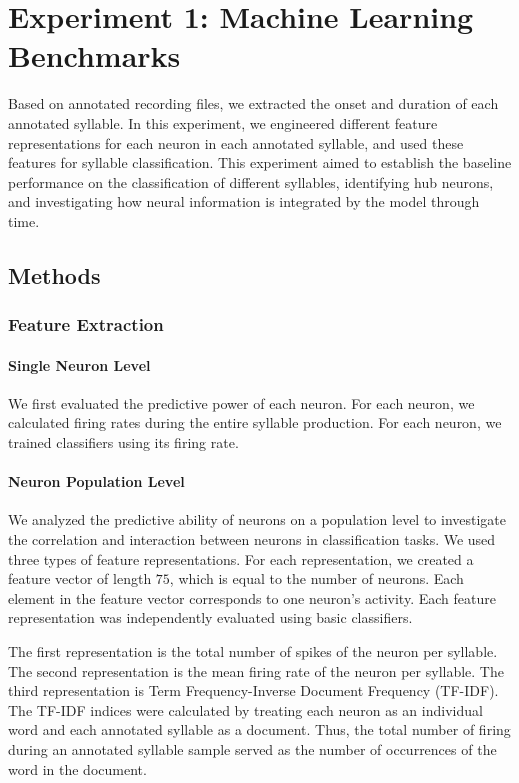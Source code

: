 \documentclass[../CLthesis.tex]{subfiles}
\begin{document}
\chapter{Experiment 1: Machine Learning Benchmarks}%
\label{exp:\theexperiment}
Based on annotated recording files, we extracted the onset and duration of each annotated syllable. In this experiment, we engineered different feature representations for each neuron in each annotated syllable, and used these features for syllable classification. This experiment aimed to establish the baseline performance on the classification of different syllables, identifying hub neurons, and investigating how neural information is integrated by the model through time.

\section{Methods}
\subsection{Feature Extraction}
\subsubsection{Single Neuron Level}
We first evaluated the predictive power of each neuron. For each neuron, we calculated firing rates during the entire syllable production. For each neuron, we trained classifiers using its firing rate.

\subsubsection{Neuron Population Level}
We analyzed the predictive ability of neurons on a population level to investigate the correlation and interaction between neurons in classification tasks. We used three types of feature representations. For each representation, we created a feature vector of length $75$, which is equal to the number of neurons. Each element in the feature vector corresponds to one neuron's activity. Each feature representation was independently evaluated using basic classifiers.

The first representation is the total number of spikes of the neuron per syllable. The second representation is the mean firing rate of the neuron per syllable. The third representation is Term Frequency-Inverse Document Frequency (TF-IDF). The TF-IDF indices were calculated by treating each neuron as an individual word and each annotated syllable as a document. Thus, the total number of firing during an annotated syllable sample served as the number of occurrences of the word in the document.
\end{document}
